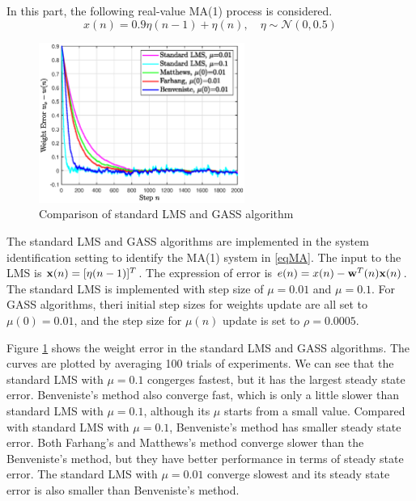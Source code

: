 \documentclass[10pt]{article}
\begin{document}
In this part, the following real-value MA(1) process is considered.
\begin{equation}
	x(n) = 0.9 \eta(n-1) + \eta(n), \quad \eta \sim \mathcal{N}(0, 0.5) \label{eqMA}
\end{equation}

\begin{figure}[htbp]
    \centering
	\includegraphics[width=0.6\textwidth]{fig/2.2_1_alter.eps}

    \caption{Comparison of standard LMS and GASS algorithm}
    \label{fig13}
\end{figure}

The standard LMS and GASS algorithms are implemented in the system identification setting 
to identify the MA(1) system in \eqref{eqMA}. The input to the LMS is ${\bf{x}}(n) = [\eta(n-1)]^T$.
The expression of error is $e(n) = x(n) - {\bf{w}}^T(n){\bf{x}}(n)$. The standard LMS is 
implemented with step size of $\mu=0.01$ and $\mu=0.1$. For GASS algorithms, theri 
initial step sizes for weights update are all set to $\mu(0)=0.01$, and the step size 
for $\mu(n)$ update is set to $\rho=0.0005$.

Figure \ref{fig13} shows the weight error in the standard LMS and GASS algorithms. The curves are
plotted by averaging 100 trials of experiments. We can see that the standard LMS with $\mu=0.1$ congerges
fastest, but it has the largest steady state error. Benveniste's method also converge fast, which is only
a little slower than standard LMS with $\mu=0.1$, although its $\mu$ starts from a small value. 
Compared with standard LMS with $\mu=0.1$, Benveniste’s method has smaller steady state error. Both 
Farhang's and Matthews's method converge slower than the Benveniste’s method, but they have better 
performance in terms of steady state error. The standard LMS with $\mu=0.01$ converge slowest and its 
steady state error is also smaller than Benveniste’s method.
\end{document}
